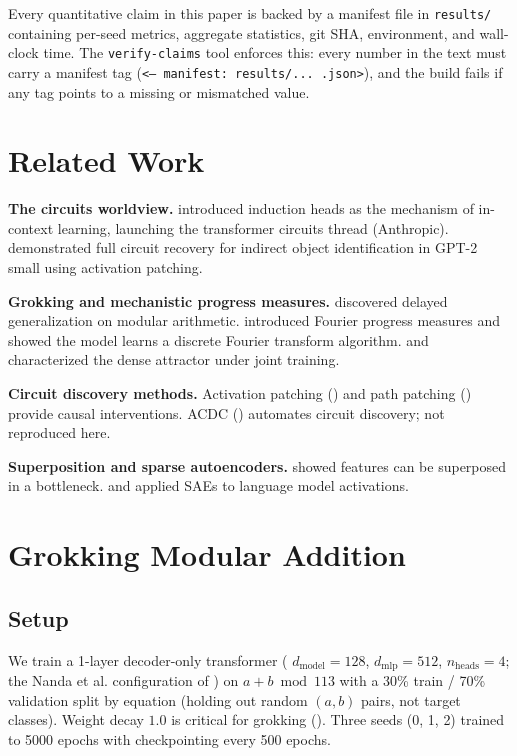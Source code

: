 \documentclass[11pt]{article}
\begin{document}
Every quantitative claim in this paper is backed by a manifest file in
\texttt{results/} containing per-seed metrics, aggregate statistics, git
SHA, environment, and wall-clock time. The \texttt{verify-claims} tool
enforces this: every number in the text must carry a manifest tag
(\texttt{\textless{}-- manifest: results/... .json\textgreater{}}), and the
build fails if any tag points to a missing or mismatched value.

\section{Related Work}
\label{sec:related}

\textbf{The circuits worldview.} \citet{olsson2022induction} introduced
induction heads as the mechanism of in-context learning, launching the
transformer circuits thread (Anthropic). \citet{wang2023interpretability}
demonstrated full circuit recovery for indirect object identification in
GPT-2 small using activation patching.

\textbf{Grokking and mechanistic progress measures.} \citet{power2022grokking}
discovered delayed generalization on modular arithmetic. \citet{nanda2023progress}
introduced Fourier progress measures and showed the model learns a
discrete Fourier transform algorithm. \citet{varma2023dense} and
\citet{lyu2024dense} characterized the dense attractor under joint training.

\textbf{Circuit discovery methods.} Activation patching (\citep{wang2023interpretability})
and path patching (\citep{zhang2024best}) provide causal
interventions. ACDC (\citep{conmy2023acdc}) automates circuit discovery; not
reproduced here.

\textbf{Superposition and sparse autoencoders.} \citet{elhage2022superposition}
showed features can be superposed in a bottleneck. \citet{bricken2023monosemanticity}
and \citet{cunningham2024sparse} applied SAEs to language model
activations.

\section{Grokking Modular Addition}
\label{sec:grokking}

\subsection{Setup}
We train a 1-layer decoder-only transformer (
$d_\text{model}=128$, $d_\text{mlp}=512$, $n_\text{heads}=4$; the Nanda et
al. configuration of \citep{nanda2023progress}) on
$a+b \bmod 113$ with a 30\% train / 70\% validation split by equation
(holding out random $(a,b)$ pairs, not target classes). Weight decay
$1.0$ is critical for grokking (\citep{power2022grokking}). Three seeds
(0, 1, 2) trained to 5000 epochs with checkpointing every 500 epochs.
\end{document}
